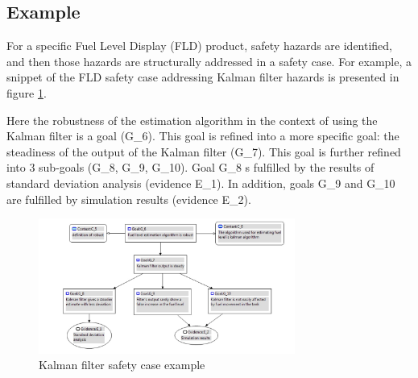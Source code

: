 \documentclass[11pt]{article}
\begin{document}
%
%
%
%
%

\subsection{Example}

For a specific Fuel Level Display (FLD) product, safety hazards are identified, and then those hazards are structurally addressed in a safety case. For example, a snippet of the FLD safety case addressing Kalman filter hazards is presented in figure \ref{fig:SafetyCaseExample}. 

Here the robustness of the estimation algorithm in the context of using the Kalman filter is a goal (G\_6). This goal is refined into a more specific goal: the steadiness of the output of the Kalman filter (G\_7).  This goal is further refined into 3 sub-goals (G\_8, G\_9, G\_10). Goal G\_8 s fulfilled by the results of standard deviation analysis (evidence E\_1). In addition, goals G\_9 and G\_10 are fulfilled by simulation results (evidence E\_2).
 
 \begin{figure}
  \centering
  \includegraphics[width=0.75\textwidth]{SafetyCaseExample}
  \caption{Kalman filter safety case example}
  \label{fig:SafetyCaseExample}
\end{figure}
\end{document}
